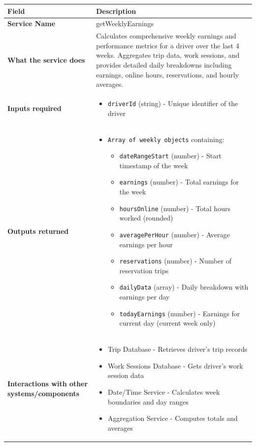 \documentclass[11pt,a4paper]{article}
\begin{document}
\begin{longtable}{|p{3cm}|p{12cm}|}
\hline
\textbf{Field} & \textbf{Description} \\
\hline
\textbf{Service Name} & getWeeklyEarnings \\
\hline
\textbf{What the service does} & 
Calculates comprehensive weekly earnings and performance metrics for a driver over the last 4 weeks. Aggregates trip data, work sessions, and provides detailed daily breakdowns including earnings, online hours, reservations, and hourly averages. \\
\hline
\textbf{Inputs required} & 
\begin{itemize}[nosep]
\item \texttt{driverId} (string) - Unique identifier of the driver
\end{itemize} \\
\hline
\textbf{Outputs returned} & 
\begin{itemize}[nosep]
\item \texttt{Array of weekly objects} containing:
  \begin{itemize}[nosep]
  \item \texttt{dateRangeStart} (number) - Start timestamp of the week
  \item \texttt{earnings} (number) - Total earnings for the week
  \item \texttt{hoursOnline} (number) - Total hours worked (rounded)
  \item \texttt{averagePerHour} (number) - Average earnings per hour
  \item \texttt{reservations} (number) - Number of reservation trips
  \item \texttt{dailyData} (array) - Daily breakdown with earnings per day
  \item \texttt{todayEarnings} (number) - Earnings for current day (current week only)
  \end{itemize}
\end{itemize} \\
\hline
\textbf{Interactions with other systems/components} & 
\begin{itemize}[nosep]
\item Trip Database - Retrieves driver's trip records
\item Work Sessions Database - Gets driver's work session data
\item Date/Time Service - Calculates week boundaries and day ranges
\item Aggregation Service - Computes totals and averages

\end{itemize}
\end{longtable}
\end{document}
